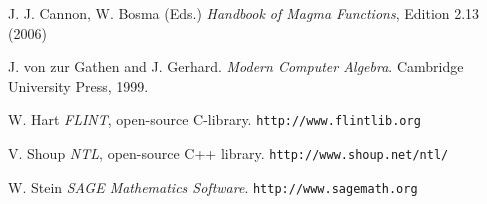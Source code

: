 \documentclass{sig-alternate-05-2015}
\begin{document}
\begin{thebibliography}{99}

J. J. Cannon, W. Bosma (Eds.) {\em Handbook of Magma Functions}, Edition 2.13 (2006)

J. von zur Gathen and J. Gerhard. {\em Modern Computer Algebra}. Cambridge University Press, 1999.

W. Hart {\em FLINT}, open-source C-library. \texttt{http://www.flintlib.org}

V. Shoup {\em NTL}, open-source C++ library. \texttt{http://www.shoup.net/ntl/}

W. Stein {\em SAGE Mathematics Software}.  \texttt{http://www.sagemath.org}

\end{thebibliography}
\end{document}
